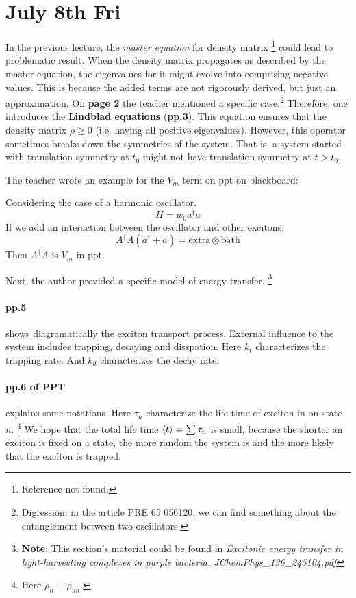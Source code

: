 \documentclass{article}
\numberwithin{equation}{subsection} %
\theoremstyle{definition}
\begin{document}
\section{July 8th Fri}
\label{sec:July_8th}
In the previous lecture, the \textit{master equation} for density matrix
\footnote{Reference not found.}
could lead to problematic result. When the density matrix propagates
as described by the master equation, the eigenvalues for it might
evolve into comprising negative values. This is because the added terms
are not rigorously derived, but just an approximation. On \textbf{page 2} the
teacher mentioned a specific case.\footnote{
    Digression: in the article PRE 65 056120, we can find
    something about the entanglement between two oscillators.
}
Therefore, one introduces the \textbf{Lindblad equations}
(\textbf{pp.3}). This equation ensures that the 
density matrix $\rho \geq 0$ (i.e. having all positive
eigenvalues). However, this operator sometimes breaks down
the symmetries of the system. That is, a system started with
translation symmetry at $t_0$ might not have translation
symmetry at $t > t_0$.

The teacher wrote an example for the $V_m$ term on ppt on blackboard:

Considering the case of a harmonic oscillator.
$$ H = w_0 a^\dagger a $$
If we add an interaction between the oscillator and other excitons:
$$ A^\dagger A (a^\dagger + a) = \text{extra} \otimes \text{bath}$$
Then $A^\dagger A$ is $V_m$ in ppt.

Next, the author provided a specific model of energy transfer.
\footnote{
\textbf{Note}: This section's material could be found in
\textit{Excitonic energy transfer in light-harvesting complexes 
in purple bacteria. JChemPhys\_136\_245104.pdf}
}

\paragraph{pp.5} shows diagramatically the exciton transport process.
External influence to the system includes trapping, decaying and disspation.
Here $k_t$ characterizes the trapping rate. And $k_d$ characterizes
the decay rate.

\paragraph{pp.6 of PPT} explains some notations.
Here $\tau_n$ characterize the life time 
of exciton in on state $n$. \footnote{ Here
$\rho_n \equiv \rho_{nn}$.} We hope that the total life time
$\braket{t} = \sum \tau_n$
is small, because the shorter an exciton is fixed on a state,
the more random the system is and the more likely that the exciton
is trapped.
\end{document}
